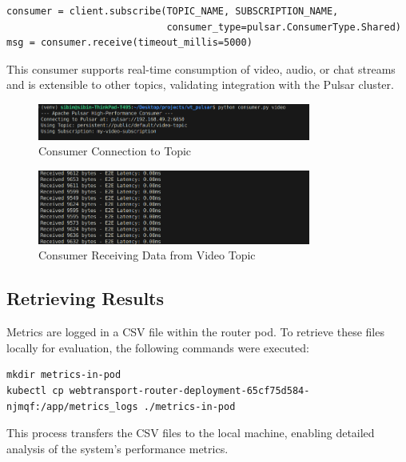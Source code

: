 \begin{lstlisting}
consumer = client.subscribe(TOPIC_NAME, SUBSCRIPTION_NAME,
                            consumer_type=pulsar.ConsumerType.Shared)
msg = consumer.receive(timeout_millis=5000)
\end{lstlisting}

This consumer supports real-time consumption of video, audio, or chat streams and is extensible to other topics, validating integration with the Pulsar cluster.

\begin{figure}[h!]
    \centering
    \includegraphics[width=0.8\textwidth]{implementation/consumer-video.png}
    \caption{Consumer Connection to Topic}
    \label{fig:consumer-conn}
\end{figure}

\begin{figure}[h!]
    \centering
    \includegraphics[width=0.8\textwidth]{implementation/pulsar-consumer-video.png}
    \caption{Consumer Receiving Data from Video Topic}
    \label{fig:consumer-data}
\end{figure}

\subsection{Retrieving Results}
Metrics are logged in a CSV file within the router pod. To retrieve these files locally for evaluation, the following commands were executed:

\begin{lstlisting}
mkdir metrics-in-pod
kubectl cp webtransport-router-deployment-65cf75d584-njmqf:/app/metrics_logs ./metrics-in-pod
\end{lstlisting}

This process transfers the CSV files to the local machine, enabling detailed analysis of the system’s performance metrics.



